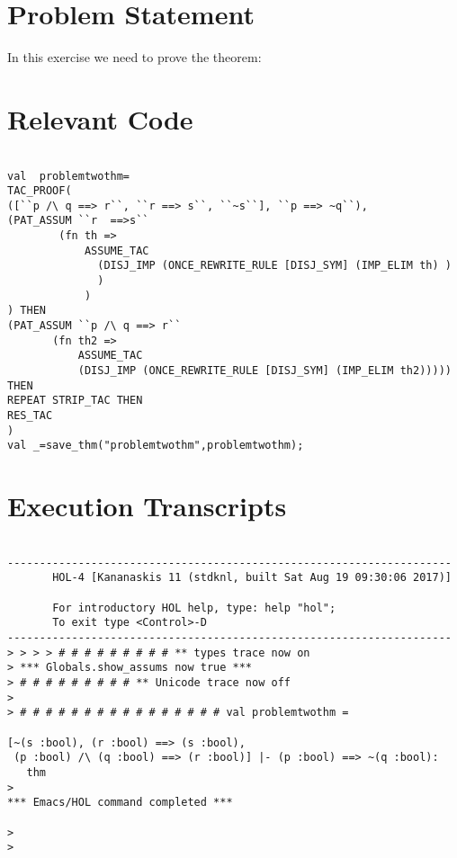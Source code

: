 \documentclass{report}
\begin{document}
 \section{Problem Statement}
 \label{sec:problem-statement-5}

In this exercise we need to prove the theorem:
\HOLTokenTurnstile{}  \HOLSymConst{\HOLTokenImp{}} \HOLSymConst{\HOLTokenNeg{}}

\section{Relevant Code}
\label{sec:relevant-code-5}
 \lstset{frameround=fftt}
\begin{lstlisting}[frame=tRBL]

val  problemtwothm=
TAC_PROOF(
([``p /\ q ==> r``, ``r ==> s``, ``~s``], ``p ==> ~q``),
(PAT_ASSUM ``r  ==>s``
	    (fn th =>
     	    ASSUME_TAC
     	      (DISJ_IMP (ONCE_REWRITE_RULE [DISJ_SYM] (IMP_ELIM th) )
              )
            )
) THEN
(PAT_ASSUM ``p /\ q ==> r``
	   (fn th2 =>
     	   ASSUME_TAC
     	   (DISJ_IMP (ONCE_REWRITE_RULE [DISJ_SYM] (IMP_ELIM th2))))) THEN
REPEAT STRIP_TAC THEN
RES_TAC
)
val _=save_thm("problemtwothm",problemtwothm);

\end{lstlisting}


\section{Execution Transcripts}
\label{sec:exec-transcr-5}

\setcounter{sessioncount}{0}
\begin{session}
  \begin{scriptsize}
\begin{verbatim}

---------------------------------------------------------------------
       HOL-4 [Kananaskis 11 (stdknl, built Sat Aug 19 09:30:06 2017)]

       For introductory HOL help, type: help "hol";
       To exit type <Control>-D
---------------------------------------------------------------------
> > > > # # # # # # # # # ** types trace now on
> *** Globals.show_assums now true ***
> # # # # # # # # # ** Unicode trace now off
> 
> # # # # # # # # # # # # # # # # val problemtwothm =
   
[~(s :bool), (r :bool) ==> (s :bool),
 (p :bool) /\ (q :bool) ==> (r :bool)] |- (p :bool) ==> ~(q :bool):
   thm
> 
*** Emacs/HOL command completed ***

> 
> 
\end{verbatim}
  \end{scriptsize}
\end{session}
\end{document}
